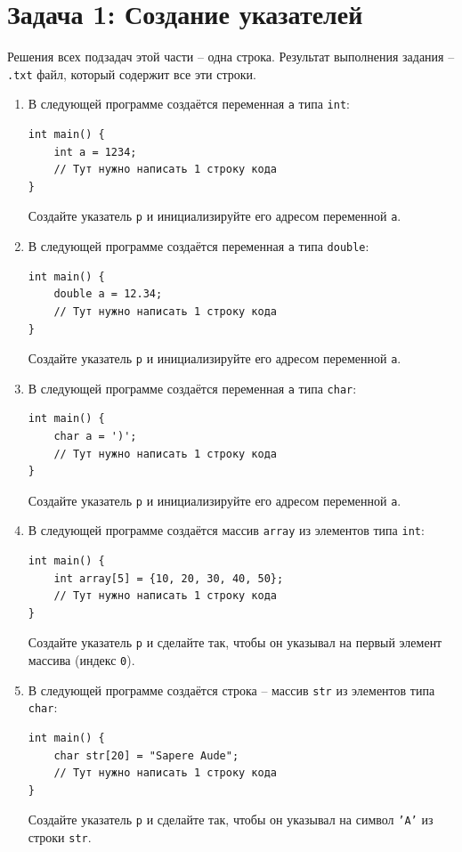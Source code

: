 \documentclass{article}
\begin{document}
\section*{Задача 1: Создание указателей}
Решения всех подзадач этой части -- одна строка. Результат выполнения задания -- \texttt{.txt} файл, который содержит все эти строки.
\begin{enumerate}
\item В следующей программе создаётся переменная \texttt{a} типа \texttt{int}:
\begin{lstlisting}
int main() {
    int a = 1234;
    // Тут нужно написать 1 строку кода
}
\end{lstlisting}
Создайте указатель \texttt{p} и инициализируйте его адресом переменной \texttt{a}.


\item В следующей программе создаётся переменная \texttt{a} типа \texttt{double}:
\begin{lstlisting}
int main() {
    double a = 12.34;
    // Тут нужно написать 1 строку кода
}
\end{lstlisting}
Создайте указатель \texttt{p} и инициализируйте его адресом переменной \texttt{a}.

\item В следующей программе создаётся переменная \texttt{a} типа \texttt{char}:
\begin{lstlisting}
int main() {
    char a = ')';
    // Тут нужно написать 1 строку кода
}
\end{lstlisting}
Создайте указатель \texttt{p} и инициализируйте его адресом переменной \texttt{a}.

\item В следующей программе создаётся массив \texttt{array} из элементов типа \texttt{int}:
\begin{lstlisting}
int main() {
    int array[5] = {10, 20, 30, 40, 50};
    // Тут нужно написать 1 строку кода
}
\end{lstlisting}
Создайте указатель \texttt{p} и сделайте так, чтобы он указывал на первый элемент массива (индекс \texttt{0}).


\item В следующей программе создаётся строка -- массив \texttt{str} из элементов типа \texttt{char}:
\begin{lstlisting}
int main() {
    char str[20] = "Sapere Aude";
    // Тут нужно написать 1 строку кода
}
\end{lstlisting}
Создайте указатель \texttt{p} и сделайте так, чтобы он указывал на символ \texttt{'A'}  из строки \texttt{str}.


\end{enumerate}
\end{document}
